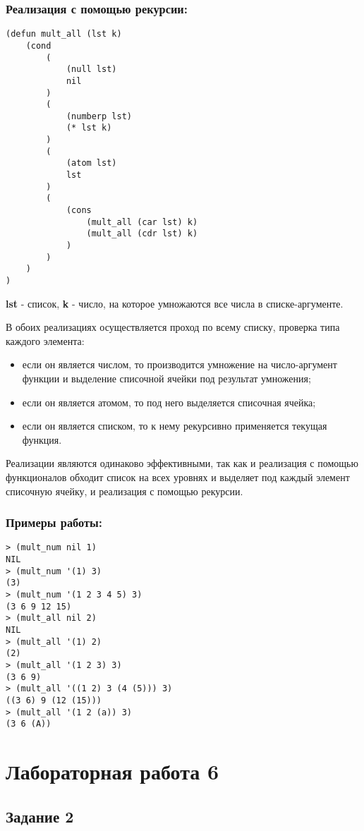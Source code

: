 \documentclass[a4paper,12pt]{article}
\begin{document}
\subsubsection*{Реализация с помощью рекурсии:}
\begin{lstlisting}[caption=Функция умножения для списка из любых объектов]
(defun mult_all (lst k)
	(cond
		(
			(null lst)
			nil
		)
		(
			(numberp lst)
			(* lst k)
		)
		(
			(atom lst)
			lst
		)
		(
			(cons
				(mult_all (car lst) k)
				(mult_all (cdr lst) k)
			)
		)
	)
)
\end{lstlisting}
\textbf{lst} - список,  \textbf{k} - число, на которое умножаются все числа в списке-аргументе.

В обоих реализациях осуществляется проход по всему списку, проверка типа каждого элемента: 
\begin{itemize}
	\item если он является числом, то производится умножение на число-аргумент функции и выделение списочной ячейки под результат умножения; 
	\item если он является атомом, то под него выделяется списочная ячейка;
	\item если он является списком, то к нему рекурсивно применяется текущая функция.
\end{itemize}

Реализации являются одинаково эффективными, так как и реализация с помощью функционалов обходит список на всех уровнях и выделяет под каждый элемент списочную ячейку, и реализация с помощью рекурсии.

\subsubsection*{Примеры работы:}
\begin{lstlisting}
> (mult_num nil 1)
NIL
> (mult_num '(1) 3)
(3)
> (mult_num '(1 2 3 4 5) 3)
(3 6 9 12 15)
> (mult_all nil 2)
NIL
> (mult_all '(1) 2)
(2)
> (mult_all '(1 2 3) 3)
(3 6 9)
> (mult_all '((1 2) 3 (4 (5))) 3)
((3 6) 9 (12 (15)))
> (mult_all '(1 2 (a)) 3)
(3 6 (A))
\end{lstlisting}

\section*{Лабораторная работа 6}

\subsection*{Задание 2}
\end{document}
